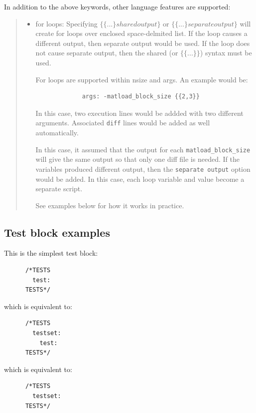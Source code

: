 In addition to the above keywords, other language features are
supported:
%
\begin{quote}
%
\begin{itemize}

\item for loops:  Specifying $\{\{ ... \}shared output\} $ 
      or $\{\{ ... \}separate output\} $ 
      will create for loops over enclosed space-delmited list.  
      If the loop causes a different output, then separate output would
      be used.  If the loop does not cause separate output, then the
      shared (or $\{\{ ... \}\} $) syntax must be used.

For loops are supported within nsize and args.  An example would be:
%
\begin{lstlisting}
             args: -matload_block_size {{2,3}}
\end{lstlisting}

In this case, two execution lines would be addded with two different
arguments.  Associated \lstinline{diff} lines would be added as well
automatically.

In this case, it assumed that the output for each
\lstinline{matload_block_size} will give the same output so
that only one diff file is needed.  If the variables
produced different output, then the \lstinline{separate output} option would be added.  In this case, each loop
variable and value become a separate script.

See examples below for how it works in practice.

\end{itemize}

\end{quote}


\subsection{Test block examples%
  \label{test-block-examples}%
}

This is the simplest test block:
%
\begin{lstlisting}
      /*TESTS
        test: 
      TESTS*/
\end{lstlisting}
which is equivalent to:
\begin{lstlisting}
      /*TESTS
        testset: 
          test: 
      TESTS*/
\end{lstlisting}
which is equivalent to:
\begin{lstlisting}
      /*TESTS
        testset: 
      TESTS*/
\end{lstlisting}


